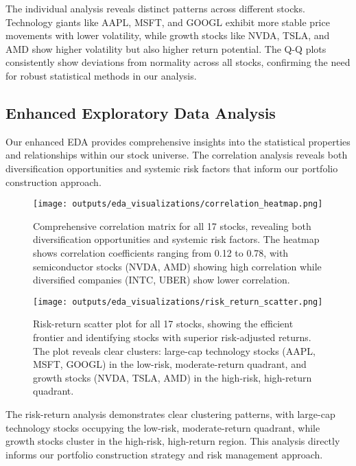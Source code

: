 \documentclass[12pt,a4paper]{article}
\begin{document}
The individual analysis reveals distinct patterns across different stocks. Technology giants like AAPL, MSFT, and GOOGL exhibit more stable price movements with lower volatility, while growth stocks like NVDA, TSLA, and AMD show higher volatility but also higher return potential. The Q-Q plots consistently show deviations from normality across all stocks, confirming the need for robust statistical methods in our analysis.

\subsection{Enhanced Exploratory Data Analysis}

Our enhanced EDA provides comprehensive insights into the statistical properties and relationships within our stock universe. The correlation analysis reveals both diversification opportunities and systemic risk factors that inform our portfolio construction approach.

\begin{figure}[H]
\centering
\texttt{[image: outputs/eda\_visualizations/correlation\_heatmap.png]}
\caption{Comprehensive correlation matrix for all 17 stocks, revealing both diversification opportunities and systemic risk factors. The heatmap shows correlation coefficients ranging from 0.12 to 0.78, with semiconductor stocks (NVDA, AMD) showing high correlation while diversified companies (INTC, UBER) show lower correlation.}
\label{fig:correlation_heatmap}
\end{figure}

\begin{figure}[H]
\centering
\texttt{[image: outputs/eda\_visualizations/risk\_return\_scatter.png]}
\caption{Risk-return scatter plot for all 17 stocks, showing the efficient frontier and identifying stocks with superior risk-adjusted returns. The plot reveals clear clusters: large-cap technology stocks (AAPL, MSFT, GOOGL) in the low-risk, moderate-return quadrant, and growth stocks (NVDA, TSLA, AMD) in the high-risk, high-return quadrant.}
\label{fig:risk_return_scatter}
\end{figure}

The risk-return analysis demonstrates clear clustering patterns, with large-cap technology stocks occupying the low-risk, moderate-return quadrant, while growth stocks cluster in the high-risk, high-return region. This analysis directly informs our portfolio construction strategy and risk management approach.
\end{document}
